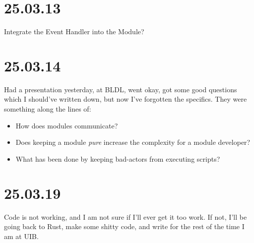 \section{25.03.13}

Integrate the Event Handler into the Module?

\section{25.03.14}

Had a presentation yesterday, at BLDL, went okay, got some good questions which
I should've written down, but now I've forgotten the specifics. They were
something along the lines of:

\begin{itemize}
  \item How does modules communicate?
  \item Does keeping a module \textit{pure} increase the complexity for a module
    developer?
  \item What has been done by keeping bad-actors from executing scripts?
\end{itemize}


\section{25.03.19}

Code is not working, and I am not sure if I'll ever get it too work. If not,
I'll be going back to Rust, make some shitty code, and write for the rest of the
time I am at UIB.
